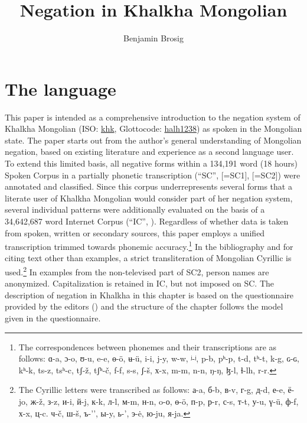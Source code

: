\documentclass[output=paper,colorlinks,citecolor=brown,chinesefont]{langscibook}
\author{Benjamin Brosig\affiliation{Academia Sinica [2018--2019]; University of Bern [2020--2023]; Nazarbayev University [2023--]}}
\title{Negation in Khalkha Mongolian}
\begin{document}
\maketitle 


\section{The language}\label{sec:kha:1}
This paper is intended as a comprehensive introduction to the negation system of Khalkha Mongolian (ISO: \href{https://iso639-3.sil.org/code/khk}{khk}, Glottocode: \href{https://glottolog.org/resource/languoid/id/halh1238}{halh1238}) as spoken in the Mongolian state. The paper starts out from the author’s general understanding of Mongolian negation, based on existing literature and experience as a second language user. To extend this limited basis, all negative forms within a 134,191 word (18 hours) Spoken Corpus in a partially phonetic transcription (“SC”, \citealt{ZolzargalBrosig2012} [=SC1], \citeyear{ZolzargalBrosig2012-2017} [=SC2]) were annotated and classified. Since this corpus underrepresents several forms that a literate user of Khalkha Mongolian would consider part of her negation system, several individual patterns were additionally evaluated on the basis of a 34,642,687 word Internet Corpus (“IC”, \citealt{OstlingBrosig2011}).
Regardless of whether data is taken from spoken, written or secondary sources, this paper employs a unified transcription trimmed towards phonemic accuracy.\footnote{The correspondences between phonemes and their transcriptions are as follows: ɑ-a, ɔ-o, ʊ-u, e-e, ɵ-ö, ʉ-ü, i-i, j-y, w-w, ʲ-ʲ, p-b, pʰ-p, t-d, tʰ-t, k-g, ɢ-ɢ, kʰ-k, ts-z, tsʰ-c, tʃ{}-ž, tʃʰ{}-č, f-f, s-s, ʃ{}-š, {х-x, m-m, n-n, ŋ-ŋ,} ɮ{}-l, ɬ{}-lh, r-r.} In the bibliography and for citing text other than examples, a strict transliteration of Mongolian Cyrillic is used.\footnote{The Cyrillic letters were transcribed as follows: {а}{}-a, {б}{}-b, {в}{}-v, {г}{}-g, {д}{}-d, {е}{}-e, {ё}{}-jo, {ж}{}-ž, {з}{}-z, {и}{}-i, {й}{}-j, {к}{}-k, {л}{}-l, {м}{}-m, {н}{}-n, o-{о}, {ө}{}-ö, {п}{}-p, {р}{}-r, {с}{}-s, {т}{}-t, {у}{}-u, {ү}{}-ü, {ф}{}-f, {х}{}-x, {ц}{}-c. {ч}{}-č, {ш}{}-š, {ъ}{}-’’, {ы}{}-y, {ь}{}-’, {э}{}-\.e, {ю}{}-ju, {я}{}-ja.} In examples from the non-televised part of SC2, person names are anonymized. Capitalization is retained in IC, but not imposed on SC. The description of negation in Khalkha in this chapter is based on the questionnaire provided by the editors () and the structure of the chapter follows the model given in the questionnaire.%
\end{document}
